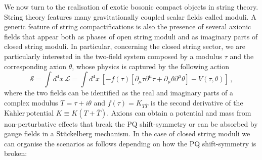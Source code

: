 \documentclass[11pt,a4paper]{article}
\newcommand{\Kahler}{\ensuremath{\text{K}\ddot{\text{a}}\text{hler}\,}}
\begin{document}
We now turn to the realisation of exotic bosonic compact objects in string theory. String theory features many gravitationally coupled scalar fields called moduli. A generic feature of string compactifications is also the presence of several axionic fields that appear both as phases of open string moduli and as imaginary parts of closed string moduli. In particular, concerning the closed string sector, we are particularly interested in the two-field system composed by a modulus $\tau$ and the corresponding axion $\theta$, whose physics is captured by the following action
\begin{equation}
\label{eq:GenericAction}
\mathcal{S} = \int d^4 x\, \mathcal{L} = \int d^4x\, \left[- f(\tau) \left[\partial_\mu \tau \partial^\mu \tau + \partial_\mu \theta \partial^\mu \theta\right] - V(\tau, \theta)\right] \,,
\end{equation}
where the two fields can be identified as the real and imaginary parts of a complex modulus $T = \tau + i \theta$ and $f(\tau) = K_{T \overline{T}}$ is the second derivative of the \Kahler potential $K \equiv K(T + \overline{T})$. Axions can obtain a potential and mass from non-perturbative effects that break the PQ shift-symmetry or can be absorbed by gauge fields in a St\"uckelberg mechanism. In the case of closed string moduli we can organise the scenarios as follows depending on how the PQ shift-symmetry is broken:
\end{document}
